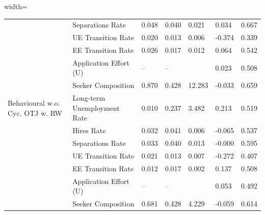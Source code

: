 \begin{adjustbox}{width=\textwidth}
\begin{tabular}{lllllll}
\cellcolor{modelBehaviouralwCycOTJwRW!25} & Separations Rate & 0.048 & 0.040 & 0.021 & \cellcolor{green!25}0.034 & 0.667 \\
\cellcolor{modelBehaviouralwCycOTJwRW!25} & UE Transition Rate & 0.020 & 0.013 & 0.006 & \cellcolor{red!25}-0.374 & 0.339 \\
\cellcolor{modelBehaviouralwCycOTJwRW!25} & EE Transition Rate & 0.026 & 0.017 & 0.012 & \cellcolor{yellow!25}0.064 & 0.542 \\
\cellcolor{modelBehaviouralwCycOTJwRW!25} & Application Effort (U) & -- & -- &  & \cellcolor{yellow!25}0.023 & 0.508 \\
\cellcolor{modelBehaviouralwCycOTJwRW!25} & Seeker Composition & 0.870 & 0.428 & 12.283 & \cellcolor{green!25}-0.033 & 0.659 \\
\cellcolor{modelBehaviouralwoCycOTJwRW!25}Behavioural w.o. Cyc. OTJ w. RW & Long-term Unemployment Rate & 0.010 & 0.237 & 3.482 & \cellcolor{yellow!25}0.213 & 0.519 \\
\cellcolor{modelBehaviouralwoCycOTJwRW!25} & Hires Rate & 0.032 & 0.041 & 0.006 & \cellcolor{yellow!25}-0.065 & 0.537 \\
\cellcolor{modelBehaviouralwoCycOTJwRW!25} & Separations Rate & 0.033 & 0.040 & 0.013 & \cellcolor{yellow!25}-0.000 & 0.595 \\
\cellcolor{modelBehaviouralwoCycOTJwRW!25} & UE Transition Rate & 0.021 & 0.013 & 0.007 & \cellcolor{green!40!yellow!25}-0.272 & 0.407 \\
\cellcolor{modelBehaviouralwoCycOTJwRW!25} & EE Transition Rate & 0.012 & 0.017 & 0.002 & \cellcolor{green!25}0.137 & 0.508 \\
\cellcolor{modelBehaviouralwoCycOTJwRW!25} & Application Effort (U) & -- & -- &  & \cellcolor{green!40!yellow!25}0.053 & 0.492 \\
\cellcolor{modelBehaviouralwoCycOTJwRW!25} & Seeker Composition & 0.681 & 0.428 & 4.229 & \cellcolor{green!40!yellow!25}-0.059 & 0.614 \\
\bottomrule
\end{tabular}
\end{adjustbox}
